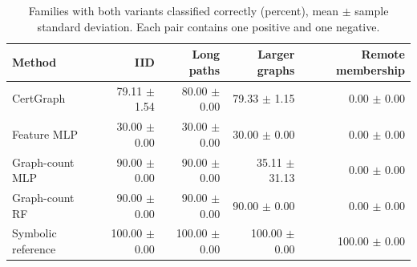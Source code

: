 \begin{table}[t]
\centering
\caption{Families with both variants classified correctly (percent), mean $\pm$ sample standard deviation. Each pair contains one positive and one negative.}
\label{tab:pairs}
\footnotesize
\begin{tabular}{lrrrr}
\toprule
Method & IID & Long paths & Larger graphs & Remote membership \\
\midrule
CertGraph & 79.11 $\pm$ 1.54 & 80.00 $\pm$ 0.00 & 79.33 $\pm$ 1.15 & 0.00 $\pm$ 0.00 \\
Feature MLP & 30.00 $\pm$ 0.00 & 30.00 $\pm$ 0.00 & 30.00 $\pm$ 0.00 & 0.00 $\pm$ 0.00 \\
Graph-count MLP & 90.00 $\pm$ 0.00 & 90.00 $\pm$ 0.00 & 35.11 $\pm$ 31.13 & 0.00 $\pm$ 0.00 \\
Graph-count RF & 90.00 $\pm$ 0.00 & 90.00 $\pm$ 0.00 & 90.00 $\pm$ 0.00 & 0.00 $\pm$ 0.00 \\
Symbolic reference & 100.00 $\pm$ 0.00 & 100.00 $\pm$ 0.00 & 100.00 $\pm$ 0.00 & 100.00 $\pm$ 0.00 \\
\bottomrule
\end{tabular}
\end{table}
